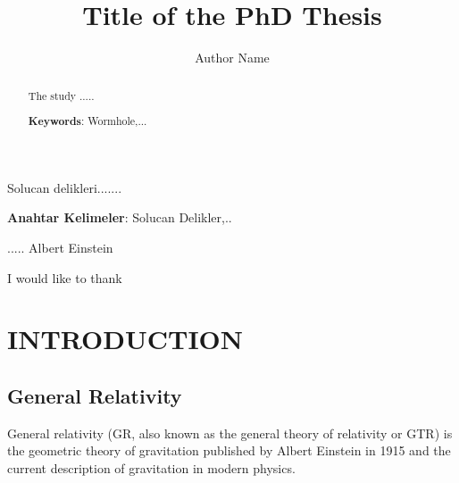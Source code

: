 \documentclass[a4paper,onesided,12pt]{report}
\begin{document}
\title{Title of the PhD Thesis}
\author{Author Name}
\makephdtitle 
\makeapprovalpage

\begin{abstract}
\vspace{-2.0cm}

\noindent The study .....

\noindent
\textbf{Keywords}: Wormhole,...

\end{abstract}



\begin{ozet}

\vspace{-2.0cm}

 \noindent Solucan delikleri.......

\noindent \textbf{Anahtar Kelimeler}: Solucan Delikler,..
 \end{ozet}



\newpage \vspace*{11.5cm} \centerline{..... Albert Einstein}

\begin{acknowledgements} 
\vspace{-1.2cm}


\noindent  I would like to thank 


\end{acknowledgements}

\tableofcontents

\listoffigures

\chapter{INTRODUCTION}


\section{General Relativity}


General relativity (GR, also known as the general theory of relativity or GTR) is the geometric theory of gravitation published by Albert Einstein in 1915 and the current description of gravitation in modern physics. \cite{ligo}
\end{document}
